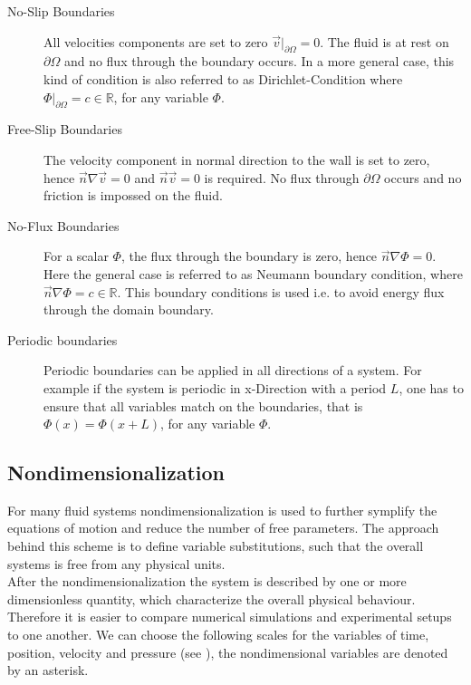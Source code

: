 \begin{description}
    \item[No-Slip Boundaries] All velocities components are set to zero $\vec{v}|_{\partial \Omega} = 0$. The fluid is at rest on $\partial \Omega$ and no flux through
                              the boundary occurs.
                              In a more general case, this kind of condition is  also referred to as Dirichlet-Condition where $\Phi|_{\partial \Omega} = c\in\mathbb{R} $,
                              for any variable $\Phi$.

    \item[Free-Slip Boundaries] The velocity component in normal direction to the wall is set to zero, hence $\vec{n} \nabla \vec{v} = 0$ and $\vec{n}\vec{v}=0$ is required.
                                No flux through $\partial \Omega$ occurs and no friction is impossed on the fluid.

    \item[No-Flux Boundaries] For a scalar $\Phi$, the flux through the boundary is zero, hence $\vec{n}\nabla \Phi = 0$.
                              Here the general case is referred to as Neumann boundary condition, where $\vec{n}\nabla \Phi = c\in \mathbb{R}$.
                              This boundary conditions is used i.e. to avoid energy flux through the domain boundary.

    \item[Periodic boundaries] Periodic boundaries can be applied in all directions of a system. For example if the system is periodic in x-Direction with a period $L$,
                                one has to ensure that all variables match on the boundaries, that is $\Phi(x) = \Phi(x + L)$, for any variable $\Phi$.
\end{description}

\subsection{Nondimensionalization}

For many fluid systems nondimensionalization is used to further symplify the equations of motion and reduce the number of free parameters.
The approach behind this scheme is to define variable substitutions, such that the overall systems is free from any physical units.\\
After the nondimensionalization the system is described by one or more dimensionless quantity, which characterize the overall physical behaviour.
Therefore it is easier to compare numerical simulations and experimental setups to one another.
We can choose the following scales for the variables of time, position, velocity and pressure (see \cite{Kundu2012}), the nondimensional variables are denoted by an asterisk.

